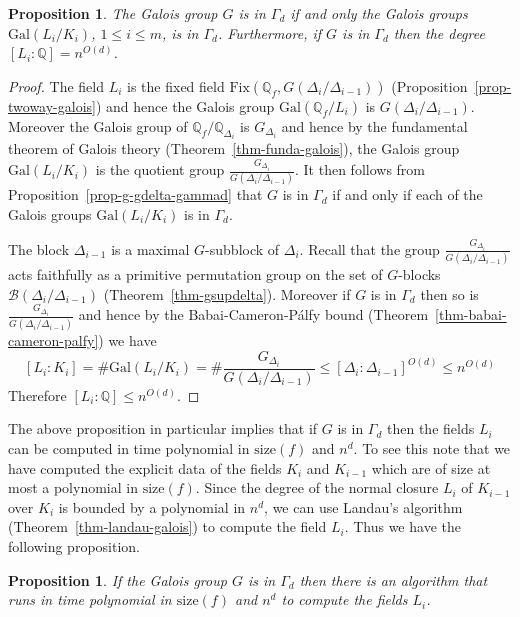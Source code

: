 \documentclass[11pt]{madras}%
\newtheorem{proposition}[theorem]{Proposition}
\theoremstyle{remark}
\newcommand{\Gal}[1]{{\ensuremath{\mathrm{Gal}\left(#1\right)}}}
\newcommand{\size}[1]{{\ensuremath{\mathrm{size}\left(#1\right)}}}
\newcommand{\Blocks}[1]{{\ensuremath{\mathcal{B}\left(#1\right)}}}
\newcommand{\Gof}[2][G]{{\ensuremath{#1\left(#2\right)}}}
\newcommand{\Fix}[2]{{\ensuremath{\mathrm{Fix}\left(#1,#2\right)}}}
\begin{document}
\begin{proposition} \label{prop-order-li-ki} The Galois group $G$ is
  in $\Gamma_d$ if and only the Galois groups $\Gal{L_i/K_i}$, $1 \leq
  i \leq m$, is in $\Gamma_d$. Furthermore, if $G$ is in $\Gamma_d$
  then the degree $[L_i:\mathbb{Q}] = n^{O(d)}$.
\end{proposition}
\begin{proof}
  The field $L_i$ is the fixed field
  $\Fix{\mathbb{Q}_f}{\Gof{\Delta_i/\Delta_{i-1}}}$
  (Proposition~\ref{prop-twoway-galois}) and hence the Galois group
  $\Gal{\mathbb{Q}_f/L_i}$ is $\Gof{\Delta_i/\Delta_{i-1}}$. Moreover
  the Galois group of $\mathbb{Q}_f/\mathbb{Q}_{\Delta_i}$ is
  $G_{\Delta_i}$ and hence by the fundamental theorem of Galois theory
  (Theorem~\ref{thm-funda-galois}), the Galois group $\Gal{L_i/K_i}$
  is the quotient group
  $\frac{G_{\Delta_i}}{\Gof{\Delta_i/\Delta_{i-1}}}$. It then follows
  from Proposition~\ref{prop-g-gdelta-gammad} that $G$ is in
  $\Gamma_d$ if and only if each of the Galois groups $\Gal{L_i/K_i}$
  is in $\Gamma_d$.

  The block $\Delta_{i-1}$ is a maximal $G$-subblock of $\Delta_i$.
  Recall that the group
  $\frac{G_{\Delta_i}}{\Gof{\Delta_i/\Delta_{i-1}}}$ acts faithfully
  as a primitive permutation group on the set of $G$-blocks
  $\Blocks{\Delta_i/\Delta_{i-1}}$ (Theorem~\ref{thm-gsupdelta}).
  Moreover if $G$ is in $\Gamma_d$ then so is
  $\frac{G_{\Delta_i}}{\Gof{\Delta_i/\Delta_{i-1}}}$ and hence by the
  Babai-Cameron-P\'alfy bound (Theorem~\ref{thm-babai-cameron-palfy})
  we have
  \[
  [L_i: K_i] = \# \Gal{L_i/K_i} = \#
  \frac{G_{\Delta_i}}{\Gof{\Delta_i/\Delta_{i-1}}} \leq
  [\Delta_i:\Delta_{i-1}]^{O(d)} \leq n^{O(d)}
  \]
  Therefore $[L_i:\mathbb{Q}] \leq n^{O(d)}$.
\end{proof}
  

The above proposition in particular implies that if $G$ is in
$\Gamma_d$ then the fields $L_i$ can be computed in time polynomial in
$\size{f}$ and $n^d$. To see this note that we have computed the
explicit data of the fields $K_i$ and $K_{i-1}$ which are of size at
most a polynomial in $\size{f}$. Since the degree of the normal
closure $L_i$ of $K_{i-1}$ over $K_i$ is bounded by a polynomial in
$n^d$, we can use Landau's algorithm (Theorem~\ref{thm-landau-galois})
to compute the field $L_i$. Thus we have the following proposition.

\begin{proposition}
  If the Galois group $G$ is in $\Gamma_d$ then there is an algorithm
  that runs in time polynomial in $\size{f}$ and $n^d$ to compute the
  fields $L_i$.
\end{proposition}
\end{document}
